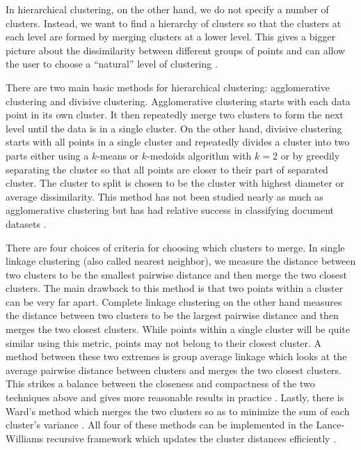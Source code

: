 \documentclass{article}
\begin{document}
In hierarchical clustering, on the other hand, we do not specify a number of clusters. Instead, we want to find a hierarchy of clusters so that the clusters at each level are formed by merging clusters at a lower level. This gives a bigger picture about the dissimilarity between different groups of points and can allow the user to choose a ``natural'' level of clustering \cite{ESL}. 

There are two main basic methods for hierarchical clustering: agglomerative clustering and divisive clustering. Agglomerative clustering starts with each data point in its own cluster. It then repeatedly merge two clusters to form the next level until the data is in a single cluster. On the other hand, divisive clustering starts with all points in a single cluster and repeatedly divides a cluster into two parts either using a $k$-means or $k$-medoids algorithm with $k=2$ or by greedily separating the cluster so that all points are closer to their part of separated cluster. The cluster to split is chosen to be the cluster with highest diameter or average dissimilarity. This method has not been studied nearly as much as agglomerative clustering \cite{ESL} but has had relative success in classifying document datasets \cite{Zhao}. 

There are four choices of criteria for choosing which clusters to merge. 
In single linkage clustering (also called nearest neighbor), we measure the distance between two clusters to be the smallest pairwise distance and then merge the two closest clusters. The main drawback to this method is that two points within a cluster can be very far apart. Complete linkage clustering on the other hand measures the distance between two clusters to be the largest pairwise distance and then merges the two closest clusters. While points within a single cluster will be quite similar using this metric, points may not belong to their closest cluster. 
A method between these two extremes is group average linkage which looks at the average pairwise distance between clusters and merges the two closest clusters. This strikes a balance between the closeness and compactness of the two techniques above and gives more reasonable results in practice \cite{ESL}. Lastly, there is Ward's method which merges the two clusters so as to minimize the sum of each cluster's variance \cite{Ward}. All four of these methods can be implemented in the Lance-Williams recursive framework which updates the cluster distances efficiently \cite{Lance}.
\end{document}
